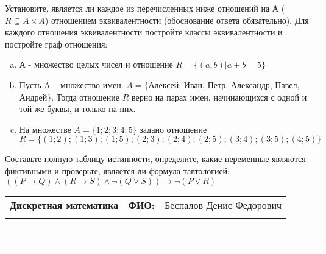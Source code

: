 \documentclass[10pt]{exam}
\newcommand{\class}{Дискретная математика}
\newcommand{\examdate}{}
\begin{document}
\begin{questions}
\question
Установите, является ли каждое из перечисленных ниже отношений на А ($R \subseteq A \times A$) отношением эквивалентности (обоснование ответа обязательно). Для каждого отношения эквивалентности постройте классы 
эквивалентности и постройте граф отношения:
\begin{enumerate} [a)]\setcounter{enumi}{0}
\item А - множество целых чисел и отношение $R = \{(a,b)|a + b = 5\}$
\item Пусть A – множество имен. $A = \{ $Алексей, Иван, Петр, Александр, Павел, Андрей$ \}$. Тогда отношение $R $ верно на парах имен, начинающихся с одной и той же буквы, и только на них.
\item На множестве $A = \{1; 2; 3; 4; 5\}$ задано отношение $R = \{(1; 2); (1; 3); (1; 5); (2; 3); (2; 4); (2; 5); (3; 4); (3; 5); (4; 5)\}$
\end{enumerate}\question Составьте полную таблицу истинности, определите, какие переменные являются фиктивными и проверьте, является ли формула тавтологией:
$((P \rightarrow Q) \land (R \rightarrow S) \land \neg (Q \lor S)) \rightarrow \neg (P \lor R)$

\end{questions}
\newpage
\begin{flushright}
\begin{tabular}{p{2.8in} r l}
\textbf{\class} & \textbf{ФИО:} &Беспалов Денис Федорович
\\

\textbf{\examdate} &&\\
\end{tabular}\\
\end{flushright}
\rule[1ex]{\textwidth}{.1pt}
\end{document}
